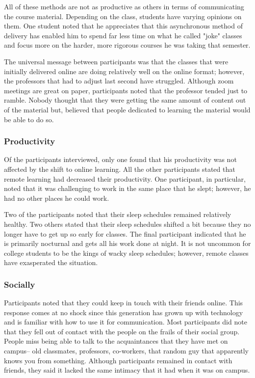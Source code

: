 \documentclass[12pt,
 reprint,
nofootinbib,
 amsmath,amssymb,
 aps,
floatfix,
]{revtex4-2}
\begin{document}
All of these methods are not as productive as others in terms of communicating the course material. Depending on the class, students have varying opinions on them. One student noted that he appreciates that this asynchronous method of delivery has enabled him to spend far less time on what he called "joke" classes and focus more on the harder, more rigorous courses he was taking that semester.

The universal message between participants was that the classes that were initially delivered online are doing relatively well on the online format; however, the professors that had to adjust last second have struggled. Although zoom meetings are great on paper, participants noted that the professor tended just to ramble. Nobody thought that they were getting the same amount of content out of the material but, believed that people dedicated to learning the material would be able to do so. 

\subsubsection{Productivity}

Of the participants interviewed, only one found that his productivity was not affected by the shift to online learning. All the other participants stated that remote learning had decreased their productivity. One participant, in particular, noted that it was challenging to work in the same place that he slept; however, he had no other places he could work.

Two of the participants noted that their sleep schedules remained relatively healthy. Two others stated that their sleep schedules shifted a bit because they no longer have to get up so early for classes. The final participant indicated that he is primarily nocturnal and gets all his work done at night. It is not uncommon for college students to be the kings of wacky sleep schedules; however, remote classes have exasperated the situation. 

\subsubsection{Socially}

Participants noted that they could keep in touch with their friends online. This response comes at no shock since this generation has grown up with technology and is familiar with how to use it for communication. Most participants did note that they fell out of contact with the people on the frails of their social group. People miss being able to talk to the acquaintances that they have met on campus-- old classmates, professors, co-workers, that random guy that apparently knows you from something. Although participants remained in contact with friends, they said it lacked the same intimacy that it had when it was on campus. 
\end{document}
